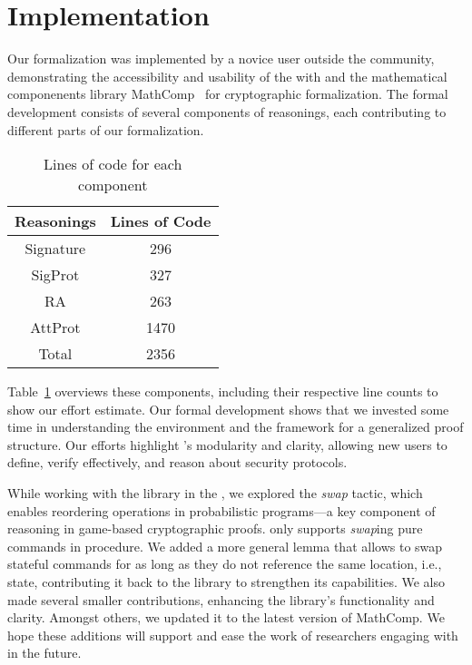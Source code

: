 \section{Implementation}
\label{sec:implement}

%
Our formalization was implemented by a novice user outside the \ssprove community, 
demonstrating the accessibility and usability of the \coq
with \ssprove and the mathematical componenents library MathComp~\cite{mahboubi2021mathematical} for cryptographic formalization.
%
The formal development consists of several components of reasonings, 
each contributing to different parts of our formalization. 
%
%
\begin{table}[b]
    \centering  
    \begin{tabular}{ ||c|c||}
        \hline 
        \textbf{Reasonings} & \textbf{Lines of Code} \\[0.5ex] 
        \hline
        Signature & 296 \\
        SigProt & 327 \\
        RA & 263 \\
        AttProt & 1470 \\ 
        \hline
        \rowcolor{lightgray} Total & 2356 \\ [1ex] 
        \hline
    \end{tabular}
    \caption{Lines of code for each component}\label{fig:LOC}
    \end{table}
%
%
Table~\ref{fig:LOC} overviews these components, including 
their respective line counts to show our effort estimate.
%
Our formal development shows that we invested some time in understanding 
the \coq environment and the \ssprove framework for a generalized proof structure.
%
Our efforts highlight \ssprove's modularity and clarity, allowing new users to define, 
verify effectively, and reason about security protocols. 
%

While working with the \ssprove library in the \coq, we explored the 
\emph{swap} tactic, which enables 
reordering operations in probabilistic programs—a key component 
of reasoning in game-based cryptographic proofs.
%
\ssprove only supports \emph{swap}ing pure commands in procedure.
%
We added a more general lemma that allows to swap stateful 
commands for as long as they do not reference the same 
location, i.e., state, contributing it back to the library 
to strengthen its capabilities.
%
We also made several smaller contributions, enhancing the 
library's functionality and clarity.
%
Amongst others, we updated it to the latest version of MathComp.
%
We hope these additions will support and ease the work 
of researchers engaging with \ssprove in the future. 
%

